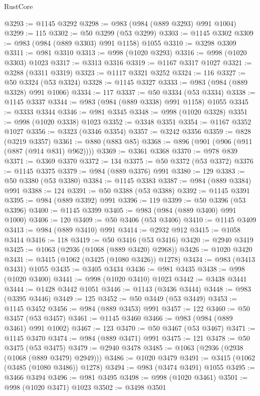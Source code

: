 \begin{lexlean}{RustCore}
\begin{coremodule}
@3293 := @1145 @3292
@3298 := @983 (@984 (@889 @3293) @991 @1004)
@3299 := 115
@3302 := @50 @3299 (@53 @3299)
@3303 := @1145 @3302
@3309 := @983 (@984 (@889 @3303) @991 @1158) @1055
@3310 := @3298 @3309
@3311 := @981 @3310
@3313 := @998 (@1020 @3293)
@3316 := @998 (@1020 @3303) @1023
@3317 := @3313 @3316
@3319 := @1167 @3317 @1027
@3321 := @3288 (@3311 @3319)
@3323 := @1117 @3321 @3252
@3324 := 116
@3327 := @50 @3324 (@53 @3324)
@3328 := @1145 @3327
@3333 := @983 (@984 (@889 @3328) @991 @1006)
@3334 := 117
@3337 := @50 @3334 (@53 @3334)
@3338 := @1145 @3337
@3344 := @983 (@984 (@889 @3338) @991 @1158) @1055
@3345 := @3333 @3344
@3346 := @981 @3345
@3348 := @998 (@1020 @3328)
@3351 := @998 (@1020 @3338) @1023
@3352 := @3348 @3351
@3354 := @1167 @3352 @1027
@3356 := @3323 (@3346 @3354)
@3357 := @3242 @3356
@3359 := @828 (@3219 @3357)
@3361 := @880 (@883 @85)
@3368 := @896 (@901 (@906 (@911 (@887 (@914 @831) @962))))
@3369 := @3361 @3368
@3370 := @978 @839
@3371 := @3369 @3370
@3372 := 134
@3375 := @50 @3372 (@53 @3372)
@3376 := @1145 @3375
@3379 := @984 (@889 @3376) @991
@3380 := 129
@3383 := @50 @3380 (@53 @3380)
@3384 := @1145 @3383
@3387 := @984 (@889 @3384) @991
@3388 := 124
@3391 := @50 @3388 (@53 @3388)
@3392 := @1145 @3391
@3395 := @984 (@889 @3392) @991
@3396 := 119
@3399 := @50 @3396 (@53 @3396)
@3400 := @1145 @3399
@3405 := @983 (@984 (@889 @3400) @991 @1000)
@3406 := 120
@3409 := @50 @3406 (@53 @3406)
@3410 := @1145 @3409
@3413 := @984 (@889 @3410) @991
@3414 := @2932 @912
@3415 := @1058 @3414
@3416 := 118
@3419 := @50 @3416 (@53 @3416)
@3420 := @2940 @3419
@3425 := @1063 (@2936 (@1068 (@889 @3420) @2968))
@3426 := @1020 @3420
@3431 := @3415 (@1062 (@3425 (@1080 @3426)) @1278)
@3434 := @983 (@3413 @3431) @1055
@3435 := @3405 @3434
@3436 := @981 @3435
@3438 := @998 (@1020 @3400)
@3441 := @998 (@1020 @3410) @1023
@3442 := @3438 @3441
@3444 := @1428 @3442 @1051
@3446 := @1143 (@3436 @3444)
@3448 := @983 (@3395 @3446)
@3449 := 125
@3452 := @50 @3449 (@53 @3449)
@3453 := @1145 @3452
@3456 := @984 (@889 @3453) @991
@3457 := 122
@3460 := @50 @3457 (@53 @3457)
@3461 := @1145 @3460
@3466 := @983 (@984 (@889 @3461) @991 @1002)
@3467 := 123
@3470 := @50 @3467 (@53 @3467)
@3471 := @1145 @3470
@3474 := @984 (@889 @3471) @991
@3475 := 121
@3478 := @50 @3475 (@53 @3475)
@3479 := @2940 @3478
@3485 := @1063 (@2936 (@2938 (@1068 (@889 @3479) @2949)))
@3486 := @1020 @3479
@3491 := @3415 (@1062 (@3485 (@1080 @3486)) @1278)
@3494 := @983 (@3474 @3491) @1055
@3495 := @3466 @3494
@3496 := @981 @3495
@3498 := @998 (@1020 @3461)
@3501 := @998 (@1020 @3471) @1023
@3502 := @3498 @3501

\end{coremodule}
\end{lexlean}
